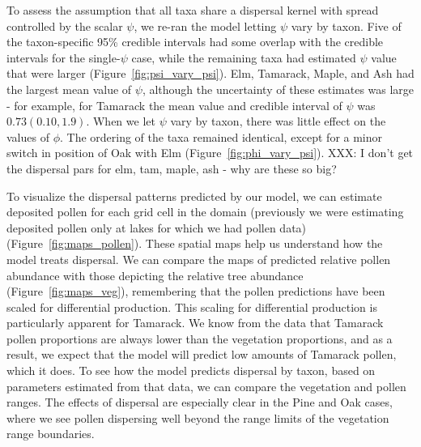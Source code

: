 \documentclass[12pt]{article}
\begin{document}
To assess the assumption that all taxa share a dispersal kernel with
spread controlled by the scalar $\psi$, we re-ran the model letting
$\psi$ vary by taxon. Five of the taxon-specific 95\% credible
intervals had some overlap with the credible intervals for the
single-$\psi$ case, while the remaining taxa had estimated $\psi$
value that were larger (Figure~\ref{fig:psi_vary_psi}). Elm, Tamarack,
Maple, and Ash had the largest mean value of $\psi$, although the
uncertainty of these estimates was large - for example, for Tamarack
the mean value and credible interval of $\psi$ was $0.73 (0.10,
1.9)$. When we let $\psi$ vary by taxon, there was little effect on
the values of $\phi$. The ordering of the taxa remained identical,
except for a minor switch in position of Oak with Elm
(Figure~\ref{fig:phi_vary_psi}). XXX: I don't get the dispersal pars
for elm, tam, maple, ash - why are these so big?



To visualize the dispersal patterns predicted by our model, we can
estimate deposited pollen for each grid cell in the domain (previously
we were estimating deposited pollen only at lakes for which we had
pollen data) (Figure~\ref{fig:maps_pollen}). These spatial maps help
us understand how the model treats dispersal. We can compare the maps
of predicted relative pollen abundance with those depicting the
relative tree abundance (Figure~\ref{fig:maps_veg}), remembering that the pollen predictions have
been scaled for differential production. This scaling for differential
production is particularly apparent for Tamarack. We know from the
data that Tamarack pollen proportions are always lower than the
vegetation proportions, and as a result, we expect that the model will
predict low amounts of Tamarack pollen, which it does. To see how the
model predicts dispersal by taxon, based on parameters estimated from
that data, we can compare the vegetation and pollen ranges. The
effects of dispersal are especially clear in the Pine and Oak cases,
where we see pollen dispersing well beyond the range limits of the
vegetation range boundaries.






\end{document}
